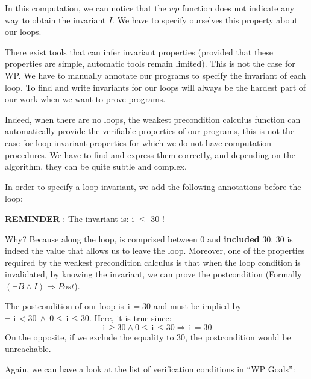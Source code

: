 In this computation, we can notice that the $wp$ function does not
indicate any way to obtain the invariant $I$. We have to specify
ourselves this property about our loops.





There exist tools that can infer invariant properties (provided that
these properties are simple, automatic tools remain limited). This is not
the case for WP. We have to manually annotate our programs to
specify the invariant of each loop. To find and write invariants for our
loops will always be the hardest part of our work when we want to prove
programs.



Indeed, when there are no loops, the weakest precondition calculus
function can automatically provide the verifiable properties of our
programs, this is not the case for loop invariant properties for which we
do not have computation procedures. We have to find and express them
correctly, and depending on the algorithm, they can be quite subtle and
complex.



In order to specify a loop invariant, we add the following annotations
before the loop:






\begin{Warning}
  \textbf{REMINDER} : The invariant is: i \textbf{$\leq$} 30 !
\end{Warning}


Why? Because along the loop,  is comprised between 0 and
\textbf{included} 30. 30 is indeed the value that allows us to leave the
loop. Moreover, one of the properties required by the weakest
precondition calculus is that when the loop condition is invalidated, by
knowing the invariant, we can prove the postcondition (Formally
$(\neg B \wedge I) \Rightarrow Post$).

The postcondition of our loop is $\texttt{i} = 30$ and must be implied
by $\neg\ \texttt{i} < 30\ \wedge\ 0 \leq \texttt{i} \leq 30$. Here, it is
true since:
$$\texttt{i} \geq 30 \wedge 0 \leq \texttt{i} \leq 30 \Rightarrow \texttt{i} = 30$$
On the opposite, if we exclude the equality to 30, the postcondition
would be unreachable.



Again, we can have a look at the list of verification conditions in
``WP Goals'':




